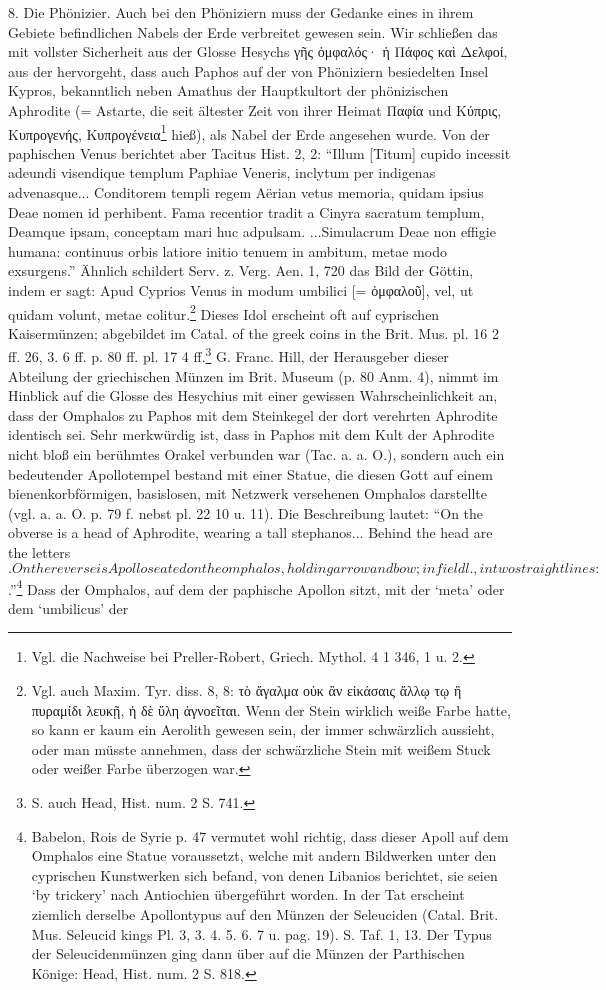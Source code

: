 \documentclass[a4paper, 11pt, oneside]{article}
\newcommand*\svgAAA{}
\newcommand*\svgAAB{}
\begin{document}
8. Die Phönizier. Auch bei den Phöniziern muss der Gedanke eines in ihrem Gebiete befindlichen Nabels der Erde verbreitet gewesen sein. Wir schließen das mit vollster Sicherheit aus der Glosse Hesychs γῆς ὀμφαλός· ἡ Πάφος καὶ Δελφοί, aus der hervorgeht, dass auch Paphos auf der von Phöniziern besiedelten Insel Kypros, bekanntlich neben Amathus der Hauptkultort der phönizischen Aphrodite (= Astarte, die seit ältester Zeit von ihrer Heimat Παφία und Κύπρις, Κυπρογενής, Κυπρογένεια\footnote{Vgl. die Nachweise bei Preller-Robert, Griech. Mythol. 4 1 346, 1 u. 2.} hieß), als Nabel der Erde angesehen wurde. Von der paphischen Venus berichtet aber Tacitus Hist. 2, 2: "`Illum [Titum] cupido incessit adeundi visendique templum Paphiae Veneris, inclytum per indigenas advenasque... Conditorem templi regem Aërian vetus memoria, quidam ipsius Deae nomen id perhibent. Fama recentior tradit a Cinyra sacratum templum, Deamque ipsam, conceptam mari huc adpulsam. ...Simulacrum Deae non effigie humana: continuus orbis latiore initio tenuem in ambitum, metae modo exsurgens."' Ähnlich schildert Serv. z. Verg. Aen. 1, 720 das Bild der Göttin, indem er sagt: Apud Cyprios Venus in modum umbilici [= ὀμφαλοῦ], vel, ut quidam volunt, metae colitur.\footnote{Vgl. auch Maxim. Tyr. diss. 8, 8: τὸ ἄγαλμα οὐκ ἂν εἰκάσαις ἄλλῳ τῳ ἢ πυραμίδι λευκῇ, ἡ δὲ ὕλη ἀγνοεῖται. Wenn der Stein wirklich weiße Farbe hatte, so kann er kaum ein Aerolith gewesen sein, der immer schwärzlich aussieht, oder man müsste annehmen, dass der schwärzliche Stein mit weißem Stuck oder weißer Farbe überzogen war.} Dieses Idol erscheint oft auf cyprischen Kaisermünzen; abgebildet im Catal. of the greek coins in the Brit. Mus. pl. 16 2 ff. 26, 3. 6 ff. p. 80 ff. pl. 17 4 ff.\footnote{S. auch Head, Hist. num. 2 S. 741.} G. Franc. Hill, der Herausgeber dieser Abteilung der griechischen Münzen im Brit. Museum (p. 80 Anm. 4), nimmt im Hinblick auf die Glosse des Hesychius mit einer gewissen Wahrscheinlichkeit an, dass der Omphalos zu Paphos mit dem Steinkegel der dort verehrten Aphrodite identisch sei. Sehr merkwürdig ist, dass in Paphos mit dem Kult der Aphrodite nicht bloß ein berühmtes Orakel verbunden war (Tac. a. a. O.), sondern auch ein bedeutender Apollotempel bestand mit einer Statue, die diesen Gott auf einem bienenkorbförmigen, basislosen, mit Netzwerk versehenen Omphalos darstellte (vgl. a. a. O. p. 79 f. nebst pl. 22 10 u. 11). Die Beschreibung lautet: "`On the obverse is a head of Aphrodite, wearing a tall stephanos... Behind the head are the letters $\svgAAA$. On the reverse is Apollo seated on the omphalos, holding arrow and bow; in field l., in two straight lines: $\svgAAB$."'\footnote{Babelon, Rois de Syrie p. 47 vermutet wohl richtig, dass dieser Apoll auf dem Omphalos eine Statue voraussetzt, welche mit andern Bildwerken unter den cyprischen Kunstwerken sich befand, von denen Libanios berichtet, sie seien `by trickery' nach Antiochien übergeführt worden. In der Tat erscheint ziemlich derselbe Apollontypus auf den Münzen der Seleuciden (Catal. Brit. Mus. Seleucid kings Pl. 3, 3. 4. 5. 6. 7 u. pag. 19). S. Taf. 1, 13. Der Typus der Seleucidenmünzen ging dann über auf die Münzen der Parthischen Könige: Head, Hist. num. 2 S. 818.} Dass der Omphalos, auf dem der paphische Apollon sitzt, mit der `meta' oder dem `umbilicus' der 
\end{document}
